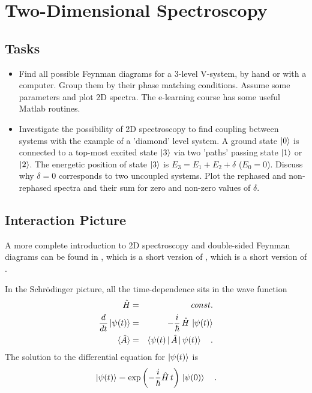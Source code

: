 \renewcommand{\lastmod}{June 21, 2024}
\renewcommand{\chapterauthors}{Markus Lippitz}


\chapter{Two-Dimensional Spectroscopy}


\section{Tasks}

\begin{itemize}
\item Find all possible Feynman diagrams for a 3-level V-system, by hand or with a computer. Group them by their phase matching conditions. Assume some parameters and plot 2D spectra. The e-learning course has some useful Matlab routines.

\item Investigate the possibility of 2D spectroscopy to find coupling between systems with the example of a 'diamond' level system. A ground state $\ket{0}$ is connected to a top-most excited state $\ket{3}$ via two 'paths' passing state $\ket{1}$ or $\ket{2}$. The energetic position of state $\ket{3}$ is $E_3 = E_1 + E_2 + \delta$ ($E_0= 0$). Discuss why $\delta = 0$ corresponds to two uncoupled systems. Plot the rephased and non-rephased spectra and their sum for zero and non-zero values of $\delta$.


\end{itemize}

\section{Interaction Picture}

A more complete introduction to 2D spectroscopy and double-sided Feynman diagrams can be found in \cite{Hamm-dummies}, which is a short version of \cite{HammZanni2011}, which is a short version of \cite{Mukamel1995}.


In the Schrödinger picture, all the time-dependence sits in the wave function
\begin{eqnarray}
 \hat{H} & = & const. \\
 \frac{d}{dt} \ket{\psi(t)} &=& - \frac{i}{\hbar} \, \hat{H} \, \ket{\psi(t)} \\
 \braket{\hat{A}} &=& \braket{\psi(t) \, | \,\hat{A} \, |\, \psi(t) }  \quad .
\end{eqnarray}
The solution to the differential equation for $\ket{\psi(t)}$ is
\begin{equation}
 \ket{\psi(t)} =  \exp \left(- \frac{i}{\hbar} \hat{H} \, t \right) \,\ket{\psi(0)} \quad .
\end{equation}


